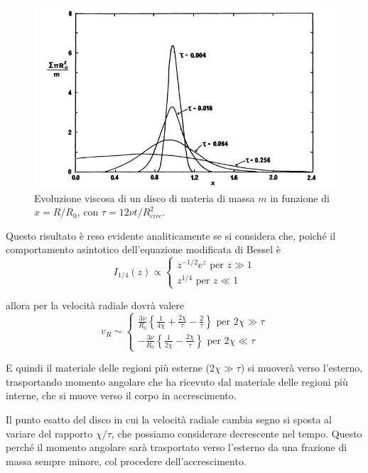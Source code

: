 \documentclass[a4paperbi]{article}
\begin{document}
	\begin{figure}[H]
		\centering
		\includegraphics[width=0.9\linewidth]{DensSuper}
		\caption{Evoluzione viscosa di un disco di materia di massa $m$ in funzione di $x=R/R_0$, con $\tau=12\nu t/R_{circ}^2$.}
		\label{fig:denssuper}
	\end{figure}

	Questo risultato è reso evidente analiticamente se si considera che, poiché il comportamento asintotico dell'equazione modificata di Bessel è
	\begin{equation*}
		I_{1/4}(z)\propto\begin{cases}
				z^{-1/2}e^z\text{ per $z\gg1$}\\
				z^{1/4}\text{ per $z\ll1$}
			\end{cases}
	\end{equation*}
	 
	allora per la velocità radiale dovrà valere
	\begin{equation*}
		v_R\sim\begin{cases}
			\frac{3\nu}{R_0}\left\{\frac{1}{4\chi}+\frac{2\chi}{\tau}-\frac{2}{\tau}\right\}\text{ per $2\chi\gg\tau$}\\
			-\frac{3\nu}{R_0}\left\{\frac{1}{2\chi}-\frac{2\chi}{\tau}\right\}\text{ per $2\chi\ll\tau$}			
			\end{cases}
	\end{equation*}
	
	E quindi il materiale delle regioni più esterne ($2\chi\gg\tau$) si muoverà verso l'esterno, trasportando momento angolare che ha ricevuto dal materiale delle regioni più interne, che si muove verso il corpo in accrescimento.
	
	Il punto esatto del disco in cui la velocità radiale cambia segno si sposta al variare del rapporto $\chi/\tau$, che possiamo considerare decrescente nel tempo. Questo perché il momento angolare sarà trasportato verso l'esterno da una frazione di massa sempre minore, col procedere dell'accrescimento.
	
\end{document}
